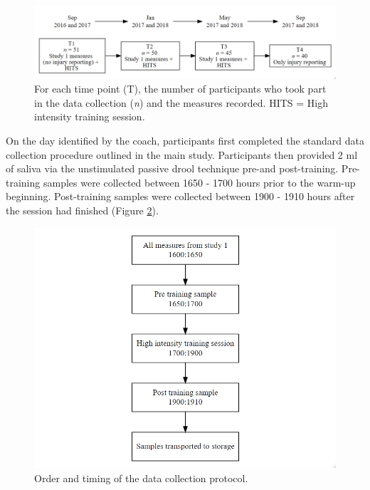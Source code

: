 \documentclass[man,floatsintext]{apa6}
\begin{document}
\begin{figure}[H]

{\centering \includegraphics[width=1\linewidth]{figs/study2/study2design_new} 

}

\caption{For each time point (T), the number of participants who took part in the data collection (\emph{n}) and the measures recorded. HITS = High intensity training session.}\label{fig:studytwodesign}
\end{figure}

On the day identified by the coach, participants first completed the standard data collection procedure outlined in the main study.
Participants then provided 2 ml of saliva via the unstimulated passive drool technique pre-and post-training.
Pre-training samples were collected between 1650 - 1700 hours prior to the warm-up beginning.
Post-training samples were collected between 1900 - 1910 hours after the session had finished (Figure \ref{fig:studytwoprotocol}).

\begin{figure}[H]

{\centering \includegraphics[width=1\linewidth]{figs/study2/study2protocol} 

}

\caption{Order and timing of the data collection protocol.}\label{fig:studytwoprotocol}
\end{figure}
\end{document}

